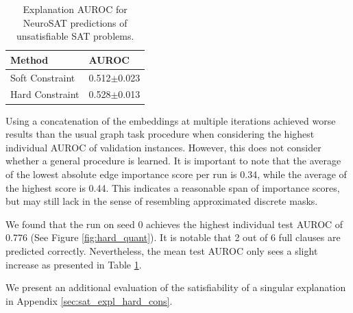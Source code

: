 \begin{table}[ht]
    \centering
    \scriptsize
    \begin{tabularx}{0.35\textwidth}{l*{1}{X}}   %
    \toprule
    \textbf{Method} & \textbf{AUROC} \\
    \midrule
    Soft Constraint & 0.512$\pm$0.023 \\
    \midrule
    Hard Constraint & 0.528$\pm$0.013 \\
    \bottomrule
    \end{tabularx}
    \caption[Inductive performance of explainer on NeuroSAT]{Explanation AUROC for NeuroSAT predictions of unsatisfiable SAT problems.}
    \label{tab:res_neuroSAT}
\end{table}

Using a concatenation of the embeddings at multiple iterations achieved worse results than the usual graph task procedure when considering the highest individual AUROC of validation instances. However, this does not consider whether a general procedure is learned. It is important to note that the average of the lowest absolute edge importance score per run is 0.34, while the average of the highest score is 0.44. This indicates a reasonable span of importance scores, but may still lack in the sense of resembling approximated discrete masks.\bigskip

We found that the run on seed 0 achieves the highest individual test AUROC of 0.776 (See Figure \ref{fig:hard_quant}). It is notable that 2 out of 6 full clauses are predicted correctly. Nevertheless, the mean test AUROC only sees a slight increase as presented in Table \ref{tab:res_neuroSAT}. \bigskip

We present an additional evaluation of the satisfiability of a singular explanation in Appendix \ref{sec:sat_expl_hard_cons}. \bigskip

